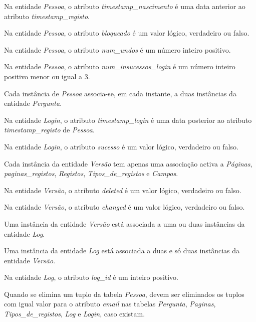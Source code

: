 \documentclass[11pt,a4paper]{article}
\begin{document}
\begin{description}[itemsep=1.5em]
  \item[RI1] Na entidade \textit{Pessoa}, o atributo \textit{timestamp\_nascimento} \'{e} uma data anterior ao atributo \textit{timestamp\_registo}.
  \item[RI2] Na entidade \textit{Pessoa}, o atributo \textit{bloqueado} \'{e} um valor l\'{o}gico, verdadeiro ou falso.


  \item[RI3] Na entidade \textit{Pessoa}, o atributo \textit{num\_undos} \'{e} um n\'{u}mero inteiro positivo.


  \item[RI4] Na entidade \textit{Pessoa}, o atributo \textit{num\_insucessos\_login} \'{e} um n\'{u}mero inteiro positivo menor ou igual a 3.
  \item[RI5] Cada instância de \textit{Pessoa} associa-se, em cada instante, a duas instâncias da entidade \textit{Pergunta}.
  \item[RI6] Na entidade \textit{Login}, o atributo \textit{timestamp\_login} \'{e} uma data posterior ao atributo \textit{timestamp\_registo} de \textit{Pessoa}.
  \item[RI7] Na entidade \textit{Login}, o atributo \textit{sucesso} \'{e} um valor l\'{o}gico, verdadeiro ou falso.
  \item[RI8] Cada instância da entidade \textit{Versão} tem apenas uma associação activa a \textit{P\'{a}ginas}, \textit{paginas\_registos}, \textit{Registos}, \textit{Tipos\_de\_registos} e \textit{Campos}.
  \item[RI9] Na entidade \textit{Versão}, o atributo \textit{deleted} \'{e} um valor l\'{o}gico, verdadeiro ou falso.
  \item[RI10] Na entidade \textit{Versão}, o atributo \textit{changed} \'{e} um valor l\'{o}gico, verdadeiro ou falso.
  \item[RI11] Uma instância da entidade \textit{Versão} est\'{a} associada a uma ou duas instâncias da entidade \textit{Log}.
  \item[RI12] Uma instância da entidade \textit{Log} está associada a duas e s\'{o} duas instâncias da entidade \textit{Versão}.
  \item[RI13] Na entidade \textit{Log}, o atributo \textit{log\_id} \'{e} um inteiro positivo.
  \item[RI14] Quando se elimina um tuplo da tabela \textit{Pessoa}, devem ser eliminados os
tuplos com igual valor para o atributo \textit{email} nas tabelas \textit{Pergunta}, \textit{Paginas},
\textit{Tipos\_de\_registos}, \textit{Log} e \textit{Login}, caso existam.


\end{description}
\end{document}
